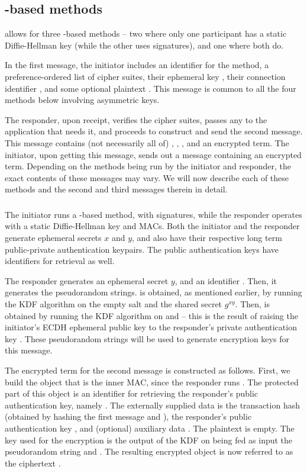 {\subsection{\mStat-based methods}
\mEdhoc{} allows for three \mStat-based methods -- two where only one participant has a static Diffie-Hellman key (while the other uses signatures), and one where both do. 

In the first message, the initiator includes an identifier for the method, a preference-ordered list of cipher suites, their ephemeral key \mGx, their connection identifier \mCi, and some optional plaintext \mADone. This message is common to all the four methods below involving asymmetric keys. 

The responder, upon receipt, verifies the cipher suites, passes any \mADone to the application that needs it, and proceeds to construct and send the second message. This message contains (not necessarily all of) \mCi, \mGy, \mCr, and an encrypted term. The initiator, upon getting this message, sends out a message containing an encrypted term. Depending on the methods being run by the initiator and responder, the exact contents of these messages may vary. We will now describe each of these methods and the second and third messages therein in detail.

\subsubsection{\mSigStat}
The initiator runs a \mSigma-based method, with signatures, while the responder operates with a static Diffie-Hellman key and MACs. Both the initiator and the responder generate ephemeral secrets $x$ and $y$, and also have their respective long term public-private authentication keypairs. The public authentication keys have identifiers for retrieval as well.

The responder generates an ephemeral secret $y$, and an identifier \mCr. Then, it generates the pseudorandom strings. \mPRKtwo is obtained, as mentioned earlier, by running the KDF algorithm on the empty salt and the shared secret $g^{xy}$. Then, \mPRKthree is obtained by running the KDF algorithm on \mPRKtwo and \mGrx -- this is the result of raising the initiator's ECDH ephemeral public key \mGx to the responder's private authentication key \mLtkr. These pseudorandom strings will be used to generate encryption keys for this message.

The encrypted term for the second message is constructed as follows. First, we build the \mCose{} object that is the inner MAC, since the responder runs \mStat. The protected part of this object is an identifier for retrieving the responder's public authentication key, namely \mIdcredr. The externally supplied data is the transaction hash \mTHtwo (obtained by hashing the first message and \mGy),  the responder's public authentication key \mCredr, and (optional) auxiliary data \mADtwo. The plaintext is empty. The key used for the encryption \mKtwom is the output of the KDF on being fed as input the pseudorandom string \mPRKthree and \mTHtwo. The resulting encrypted object is now referred to as the ciphertext \mMactwo. 

}
